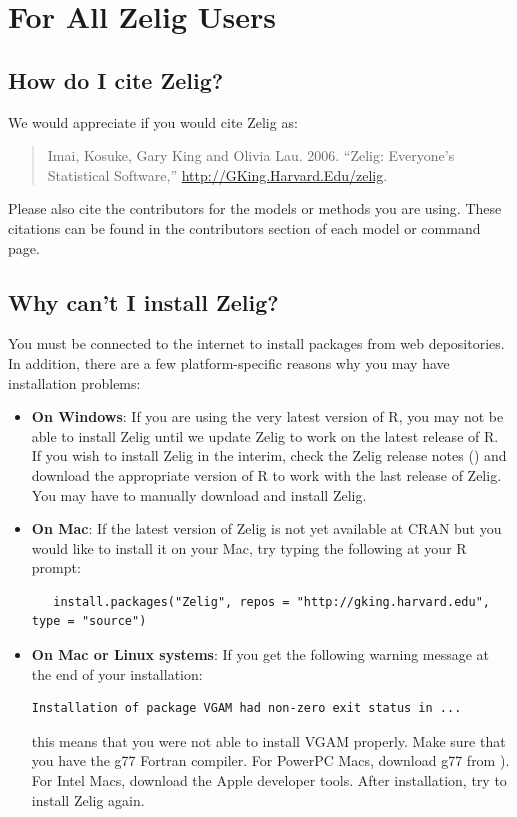 \section{For All Zelig Users}

\subsection*{How do I cite Zelig?}
We would appreciate if you would cite Zelig as:  
\begin{verse}
  Imai, Kosuke, Gary King and Olivia Lau.  2006.  ``Zelig:
  Everyone's Statistical Software,''   \url{http://GKing.Harvard.Edu/zelig}.
\end{verse}
Please also cite the contributors for the models or methods you are
using.  These citations can be found in the contributors section of
each model or command page.

\subsection*{Why can't I install Zelig?}

You must be connected to the internet to install packages from web
depositories.  In addition, there are a few platform-specific reasons
why you may have installation problems:

\begin{itemize}
\item \textbf{On Windows}: If you are using the very latest version of
  R, you may not be able to install Zelig until we update Zelig to
  work on the latest release of R. If you wish to install Zelig in the
  interim, check the Zelig release notes () and
  download the appropriate version of R to work with the last release
  of Zelig.  You may have to manually download and install Zelig.  

\item \textbf{On Mac}: If the latest version of Zelig is not yet
  available at CRAN but you would like to install it on your Mac, try
  typing the following at your R prompt:
\begin{verbatim}
   install.packages("Zelig", repos = "http://gking.harvard.edu", type = "source")
\end{verbatim}

\item \textbf{On Mac or Linux systems}:  
If you get the following
  warning message at the end of your installation:  
\begin{verbatim}
Installation of package VGAM had non-zero exit status in ...
\end{verbatim}
this means that you were not able to install VGAM properly.  Make sure
that you have the g77 Fortran compiler.  For PowerPC Macs, download
g77 from
). For
Intel Macs, download the
 Apple developer
tools.  After installation, try to install Zelig again.  
\end{itemize}


